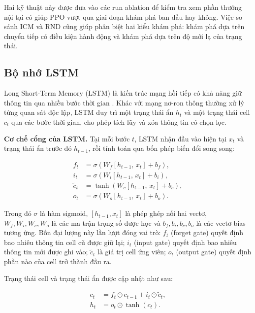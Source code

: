 Hai kỹ thuật này được đưa vào các run ablation để kiểm tra xem phần thưởng nội tại có giúp PPO vượt qua giai đoạn khám phá ban đầu hay không. Việc so sánh ICM và RND cũng giúp phân biệt hai kiểu khám phá: khám phá dựa trên chuyển tiếp có điều kiện hành động và khám phá dựa trên độ mới lạ của trạng thái.

\subsection{Bộ nhớ LSTM}

Long Short-Term Memory (LSTM) là kiến trúc mạng hồi tiếp có khả năng giữ thông tin qua nhiều bước thời gian \cite{Hochreiter1997}. Khác với mạng nơ-ron thông thường xử lý từng quan sát độc lập, LSTM duy trì một trạng thái ẩn $h_t$ và một trạng thái cell $c_t$ qua các bước thời gian, cho phép tích lũy và xóa thông tin có chọn lọc.

\textbf{Cơ chế cổng của LSTM.} Tại mỗi bước $t$, LSTM nhận đầu vào hiện tại $x_t$ và trạng thái ẩn trước đó $h_{t-1}$, rồi tính toán qua bốn phép biến đổi song song:

\begin{align}
    f_t &= \sigma\!\left(W_f [h_{t-1},\, x_t] + b_f\right), \label{eq:lstm_forget} \\
    i_t &= \sigma\!\left(W_i [h_{t-1},\, x_t] + b_i\right), \label{eq:lstm_input} \\
    \tilde{c}_t &= \tanh\!\left(W_c [h_{t-1},\, x_t] + b_c\right), \label{eq:lstm_candidate} \\
    o_t &= \sigma\!\left(W_o [h_{t-1},\, x_t] + b_o\right). \label{eq:lstm_output}
\end{align}

Trong đó $\sigma$ là hàm sigmoid, $[h_{t-1}, x_t]$ là phép ghép nối hai vectơ, $W_f, W_i, W_c, W_o$ là các ma trận trọng số được học và $b_f, b_i, b_c, b_o$ là các vectơ bias tương ứng. Bốn đại lượng này lần lượt đóng vai trò: $f_t$ (forget gate) quyết định bao nhiêu thông tin cell cũ được giữ lại; $i_t$ (input gate) quyết định bao nhiêu thông tin mới được ghi vào; $\tilde{c}_t$ là giá trị cell ứng viên; $o_t$ (output gate) quyết định phần nào của cell trở thành đầu ra.

Trạng thái cell và trạng thái ẩn được cập nhật như sau:

\begin{align}
    c_t &= f_t \odot c_{t-1} + i_t \odot \tilde{c}_t, \label{eq:lstm_cell} \\
    h_t &= o_t \odot \tanh(c_t). \label{eq:lstm_hidden}
\end{align}

